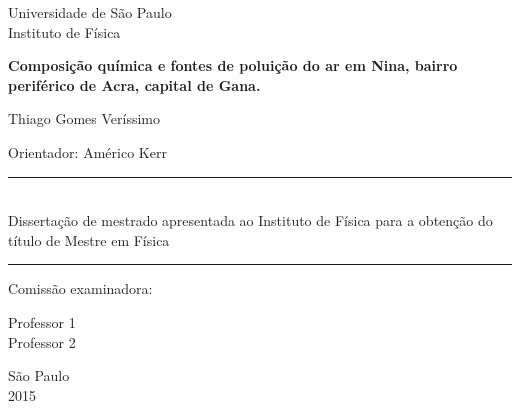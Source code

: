 \begin{titlepage}
\setlength{\voffset}{0pt}
\setlength{\hoffset}{0pt}
\centering
\Large{Universidade de São Paulo \\
Instituto de Física}

\LARGE{\bf Composição química e fontes de poluição do ar 
       em Nina, bairro periférico de Acra, capital de Gana.
}


\Large{ Thiago Gomes Veríssimo
}


\begin{flushright}

\begin{minipage}{.6\textwidth}
\large{Orientador: Américo Kerr
}
\end{minipage}


\begin{minipage}{.6\textwidth}
\rule{\linewidth}{0.5mm}\\
\large{
Dissertação de mestrado apresentada ao Instituto de Física para a obtenção do 
título de Mestre em Física
}

\rule{\linewidth}{0.5mm}
\end{minipage}
\end{flushright}


\begin{flushleft}

\normalsize
Comissão examinadora:\\
\hspace{.03\textwidth}\begin{minipage}{.97\textwidth}
Professor 1 \\
Professor 2
\end{minipage}
\end{flushleft}


São Paulo\\
2015

\end{titlepage}

